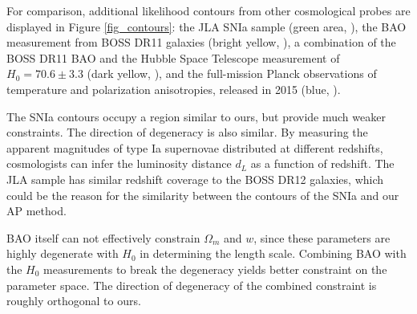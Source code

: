 \documentclass[iop]{emulateapj}
\begin{document}
For comparison, additional likelihood contours from other cosmological probes are displayed in Figure \ref{fig_contours}:
the JLA SNIa sample (green area, \cite{JLA}),
the BAO measurement from BOSS DR11 galaxies (bright yellow, \cite{Anderson2013}),
a combination of the BOSS DR11 BAO and the Hubble Space Telescope measurement of $H_0=70.6\pm3.3$ (dark yellow, \cite{Riess2011,E14H0}),
and the full-mission Planck observations of temperature and polarization anisotropies, released in 2015 (blue, \cite{Planck2015}).

%
The SNIa contours occupy a region similar to ours, but provide much weaker constraints. %
The direction of degeneracy is also similar.
By measuring the apparent magnitudes of type Ia supernovae distributed at different redshifts, 
 cosmologists can infer the luminosity distance $d_L$ as a function of redshift.
The JLA sample has similar redshift coverage to the BOSS DR12 galaxies,
which could be the reason for the similarity between the contours of the SNIa and our AP method.



BAO itself can not effectively constrain $\Omega_m$ and $w$, 
since these parameters are highly degenerate with $H_0$ in determining the length scale.
Combining BAO with the $H_0$ measurements to break the degeneracy yields better constraint on the parameter space.
The direction of degeneracy of the combined constraint is roughly orthogonal to ours.
\end{document}

